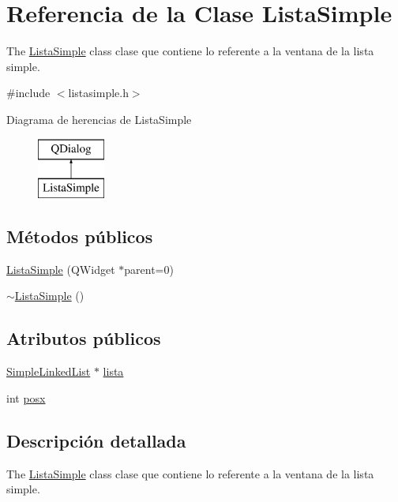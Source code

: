 \hypertarget{class_lista_simple}{}\section{Referencia de la Clase Lista\+Simple}
\label{class_lista_simple}


The \mbox{\hyperlink{class_lista_simple}{Lista\+Simple}} class clase que contiene lo referente a la ventana de la lista simple.  




{\ttfamily \#include $<$listasimple.\+h$>$}

Diagrama de herencias de Lista\+Simple\begin{figure}[H]
\begin{center}
\leavevmode
\includegraphics[height=2.000000cm]{class_lista_simple}
\end{center}
\end{figure}
\subsection*{Métodos públicos}
\begin{DoxyCompactItemize}
\item 
\mbox{\hyperlink{class_lista_simple_a8fd950a3f4bc90c23a163e9e381081f4}{Lista\+Simple}} (Q\+Widget $\ast$parent=0)
\item 
\mbox{\hyperlink{class_lista_simple_a44b1edd7d0e73b6e80748c712715e42a}{$\sim$\+Lista\+Simple}} ()
\end{DoxyCompactItemize}
\subsection*{Atributos públicos}
\begin{DoxyCompactItemize}
\item 
\mbox{\hyperlink{class_simple_linked_list}{Simple\+Linked\+List}} $\ast$ \mbox{\hyperlink{class_lista_simple_a46e5f8b712f9569021b223e60acabdaa}{lista}}
\item 
int \mbox{\hyperlink{class_lista_simple_a287deeb5d9e391d810d309798e8bf026}{posx}}
\end{DoxyCompactItemize}


\subsection{Descripción detallada}
The \mbox{\hyperlink{class_lista_simple}{Lista\+Simple}} class clase que contiene lo referente a la ventana de la lista simple. 

